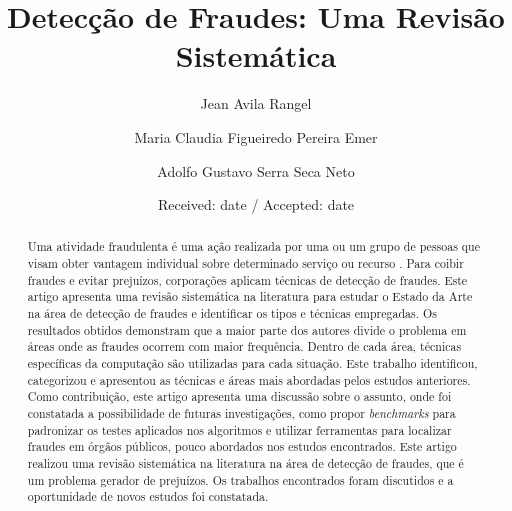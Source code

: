 \documentclass[smallextended]{svjour3}
\begin{document}
\title{Detecção de Fraudes: Uma Revisão Sistemática
}
\subtitle{}
\author{Jean Avila Rangel         \and
	Maria Claudia Figueiredo Pereira Emer \and
	Adolfo Gustavo Serra Seca Neto
}
	\date{Received: date / Accepted: date}
	\maketitle
	
	\begin{abstract}
			
Uma atividade fraudulenta é uma ação realizada por uma ou um grupo de pessoas que visam obter vantagem individual sobre determinado serviço ou recurso \citep{Abdallah2016}. Para coibir fraudes e evitar prejuízos, corporações aplicam técnicas de detecção de fraudes. Este artigo apresenta uma revisão sistemática na literatura para estudar o Estado da Arte na área de detecção de fraudes e identificar os tipos e técnicas empregadas. Os resultados obtidos demonstram que a maior parte dos autores divide o problema em áreas onde as fraudes ocorrem com maior frequência. Dentro de cada área, técnicas específicas da computação são utilizadas para cada situação. Este trabalho identificou, categorizou e apresentou as técnicas e áreas mais abordadas pelos estudos anteriores. Como contribuição, este artigo apresenta uma discussão sobre o assunto, onde foi constatada a possibilidade de futuras investigações, como propor \emph{benchmarks} para padronizar os testes aplicados nos algoritmos e utilizar ferramentas para localizar fraudes em órgãos públicos, pouco abordados nos estudos encontrados. Este artigo realizou uma revisão sistemática na literatura na área de detecção de fraudes, que é um problema gerador de prejuízos. Os trabalhos encontrados foram discutidos e a oportunidade de novos estudos foi constatada.   
		
		
		
	\end{abstract}
	
\end{document}
